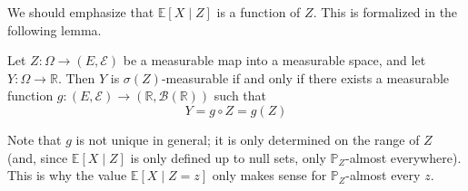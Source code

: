 	We should emphasize that $\mathbb{E}[X \mid Z]$ is a function of $Z$. This is formalized in the following lemma. 

	\begin{lemma}
	  \label{lem:doob-dynkin}
	  Let $Z \colon \Omega \to (E, \mathcal{E})$ be a measurable map into a measurable space, and let $Y \colon \Omega \to \mathbb{R}$. Then $Y$ is $\sigma(Z)$-measurable if and only if there exists a measurable function $g \colon (E, \mathcal{E}) \to (\mathbb{R}, \mathcal{B}(\mathbb{R}))$ such that
		\begin{equation}
			Y = g \circ Z = g(Z)
		\end{equation}
	\end{lemma}

	Note that $g$ is not unique in general; it is only determined on the range of $Z$ (and, since $\mathbb{E}[X \mid Z]$ is only defined up to null sets, only $\mathbb{P}_Z$-almost everywhere). This is why the value $\mathbb{E}[X \mid Z = z]$ only makes sense for $\mathbb{P}_Z$-almost every $z$.

